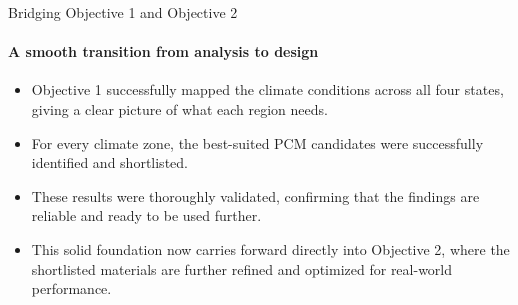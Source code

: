 \documentclass[aspectratio=169, 11pt]{beamer}
\begin{document}
\begin{frame}{Bridging Objective 1 and Objective 2}
\framesubtitle{A smooth transition from analysis to design}

\footnotesize
\begin{itemize}
    \setlength{\itemsep}{6pt}
    \item Objective 1 successfully mapped the climate conditions across
    all four states, giving a clear picture of what each region needs.
    \item For every climate zone, the best-suited PCM candidates were
    successfully identified and shortlisted.
    \item These results were thoroughly validated, confirming that the
    findings are reliable and ready to be used further.
    \item This solid foundation now carries forward directly into
    Objective 2, where the shortlisted materials are further refined
    and optimized for real-world performance.
\end{itemize}
\end{frame}


%
\end{document}
